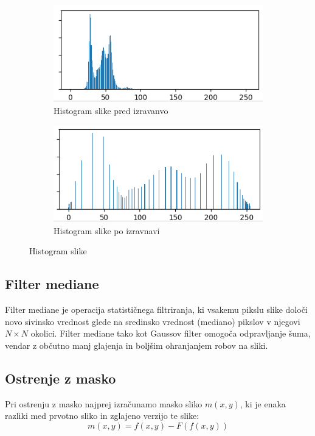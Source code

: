 \documentclass[a4paper, twocolumn]{article}
\begin{document}
\begin{figure}[h]
	\begin{subfigure}[t]{0.49\linewidth}
		\includegraphics[width=\linewidth]{histogram_prej.png}
		\caption{Histogram slike pred izravanvo}
	\end{subfigure}
	\begin{subfigure}[t]{0.49\linewidth}
		\includegraphics[width=\linewidth]{histogram_potem.png}
		\caption{Histogram slike po izravnavi}
	\end{subfigure}
	\caption{Histogram slike}
\end{figure}


\subsection{Filter mediane}
Filter mediane je operacija statističnega filtriranja, ki vsakemu pikslu slike določi novo sivinsko vrednost glede na sredinsko vrednost (mediano) pikslov v njegovi $N\times N$ okolici.
Filter mediane tako kot Gaussov filter omogoča odpravljanje šuma, vendar z občutno manj glajenja in boljšim ohranjanjem robov na sliki.

\subsection{Ostrenje z masko}
Pri ostrenju z masko najprej izračunamo masko sliko $m(x,y)$, ki je enaka razliki med prvotno sliko in zglajeno verzijo te slike:
\begin{equation}
m(x,y)=f(x,y)-F(f(x,y))
\end{equation}
\end{document}
